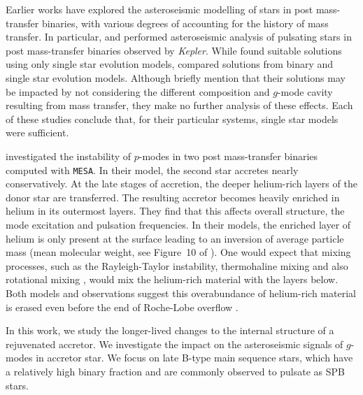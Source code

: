 \documentclass[desactivate]{aa}
\newcommand{\referee}[1]{{#1}}
\begin{document}
Earlier works have explored the asteroseismic modelling of stars in post mass-transfer binaries, with various degrees of accounting for the history of mass transfer. In particular, \citet{Guo2017b, Guo+2017:2017ApJ...837..114G} and \citet{Chen2021} performed asteroseismic analysis of pulsating stars in post mass-transfer binaries observed by {\it Kepler}. While \citet{Guo2017b,Guo+2017:2017ApJ...837..114G} found suitable solutions using only single star evolution models, \citet{Chen2021} compared solutions from binary and single star evolution models. Although \citet{Guo+2017:2017ApJ...837..114G} briefly mention that their solutions may be impacted by not considering the different composition and $g$-mode cavity resulting from mass transfer, they make no further analysis of these effects. Each of these studies conclude that, for their particular systems, single star models were sufficient. 

\citet{Miszuda+2021,Miszuda+2022:2022MNRAS.514..622M} investigated the instability of $p$-modes in two post mass-transfer binaries computed with \texttt{MESA}. In their model, the second star accretes nearly conservatively. At the late stages of accretion, the deeper helium-rich layers of the donor star are transferred. The resulting accretor becomes heavily enriched in helium in its outermost layers. They find that this affects overall structure, the mode excitation and pulsation frequencies. In their models, the enriched layer of helium is only present at the surface leading to an inversion of average particle mass (mean molecular weight, \referee{see Figure~10 of \citealt{Miszuda+2021}}). One would expect that mixing processes, such as the Rayleigh-Taylor instability, thermohaline mixing and also rotational mixing \citep{Kippenhahn+1980, Cantiello+2007}, would mix the helium-rich material with the layers below. Both models and observations suggest this overabundance of helium-rich material is erased even before the end of Roche-Lobe overflow \citep{Renzo+2021}.

In this work, we study the longer-lived changes to the internal structure of a rejuvenated accretor.  We investigate the impact on the asteroseismic signals of $g$-modes in accretor star.  We focus on late B-type main sequence stars, which have a relatively high binary fraction and are commonly observed to pulsate as SPB stars. 
\end{document}
